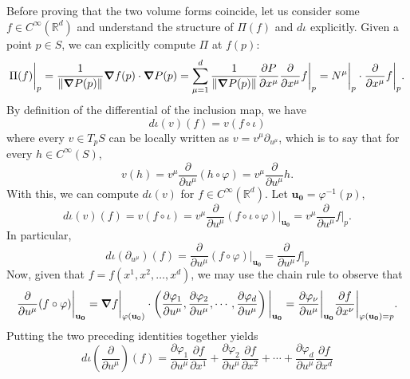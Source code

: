\documentclass{article}
\newcommand{\p}{\partial}
\newcommand{\R}{\mathbb{R}}
\newcommand{\f}[2]{\frac{#1}{#2}}
\theoremstyle{theorem}
\begin{document}
Before proving that the two volume forms coincide, let us consider some $f\in C^\infty(\R^d)$ and understand the structure of $\Pi(f)$ and $d\iota$ explicitly. Given a point $p\in S$, we can explicitly compute $\Pi$ at $f(p)$: 
\begin{equation*}
\Pi(f)\bigg\vert_p = \f{1}{\norm{\grad P(p)}} \grad f(p) \cdot \grad P(p) 
= \sum^d_{\mu = 1} \f{1}{\norm{\grad P(p)}} \f{\p P}{\p x^\mu} \f{\p}{\p x^\mu} f \bigg\vert_{p} 
= N^\mu\bigg\vert_{p}\cdot \f{\p}{\p x^\mu}f\bigg\vert_{p}.
\end{equation*}
By definition of the differential of the inclusion map, we have
\begin{equation*}
d\iota(v)(f)=v(f\circ\iota)
\end{equation*}
where every $v\in T_pS$ can be locally written as 
$v =v^\mu \p_{u^\mu}$, which is to say that for every $h \in C^\infty(S)$, 
\begin{equation*}
    v(h) = v^\mu \f{\p}{\p u^\mu} (h\circ \varphi) = v^\mu \f{\p}{\p u^\mu} h.
\end{equation*}
With this, we can compute $d\iota(v)$ for $f\in C^{\infty}(\R^d)$. Let $\mathbf{u_0} = \varphi^{-1}(p)$,
\begin{equation*}
d\iota(v)(f) =v(f\circ\iota)=v^{\mu}\frac{\partial}{\partial u^{\mu}}(f\circ\iota\circ\varphi)\bigg\vert_{\mathbf{u_0}}
=v^\mu\frac{\partial}{\partial u^{\mu}} f \bigg\vert_{p}.
\end{equation*}
In particular, 
\begin{equation*}
d\iota(\partial_{u^\mu})(f)=\frac{\partial}{\partial u^{\mu}}(f\circ\varphi)\bigg\vert_{\mathbf{u_0}} = \f{\p}{\p u^\mu} f \bigg\vert_{p}
\end{equation*}
Now, given that $f=f(x^1,x^2,\dots,x^d)$, we may use the chain rule to observe that
\begin{equation*}
\frac{\partial}{\partial u^{\mu}}
(f\circ\varphi)\bigg\vert_{\mathbf{u_0}}
=\grad f\bigg\vert_{\varphi(\mathbf{u}_0)}\cdot\left(\frac{\partial\varphi_1}{\partial u^{\mu}},\frac{\partial\varphi_2}{\partial u^{\mu}},\cdots,\frac{\partial\varphi_d}{\partial u^{\mu}}\right)\bigg\vert_{\mathbf{u_0}}
= \f{\p \varphi_\nu}{\p u^\mu}\bigg\vert_{\mathbf{u_0}} \f{\p f}{\p x^\nu}\bigg\vert_{\varphi(\mathbf{u_0}) = p}.
\end{equation*}
Putting the two preceding identities together yields
\begin{equation*}
d\iota\left(\frac{\partial}{\partial u^\mu}\right)(f) =\frac{\partial\varphi_1}{\partial u^{\mu}}\frac{\partial f}{\partial x^1}+\frac{\partial\varphi_2}{\partial u^{\mu}}\frac{\partial f}{\partial x^2}+\cdots+\frac{\partial\varphi_d}{\partial u^{\mu}}\frac{\partial f}{\partial x^d}
\end{equation*}
\end{document}
